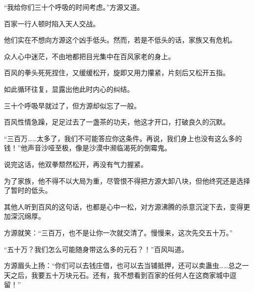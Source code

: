 \begin{this_body}
“我给你们三十个呼吸的时间考虑。”方源又道。

百家一行人顿时陷入天人交战。

他们实在不想向方源这个凶手低头。然而，若是不低头的话，家族又有危机。

众人心中迷茫，不由地都把目光集中在百风家老的身上。

百风的拳头死死捏住，又缓缓松开，旋即又用力攥紧，片刻后又松开五指。

如此循环往复，显露出他此时内心的纠结。

三十个呼吸早就过了，但方源却似忘了一般。

百风性情急躁，足足过去了一盏茶的功夫，他这才开口，打破良久的沉默。

“三百万……太多了，我们不可能答应你这条件。再说，我们身上也没有这么多的钱！”他声音沙哑至极，像是沙漠中濒临渴死的倒霉鬼。

说完这话，他双拳颓然松开，再没有气力握紧。

为了家族，他不得不以大局为重，尽管恨不得把方源大卸八块，但他终究还是选择了暂时的低头。

其他人听到百风的这句话，也都是心中一松，对方源沸腾的杀意沉淀下去，变得更加深沉绵厚。

方源就笑：“三百万，也不是让你一次就交清了。慢慢来，这次先交五十万。”

“五十万？我们怎么可能随身带这么多的元石？！”百风叫道。

方源眉头上扬：“你们可以去钱庄借，也可以去当铺抵押，还可以卖蛊虫……总之一天之后，我要五十万块元石。还有，我不想看到百家的任何人在这商家城中逗留！”

\end{this_body}

